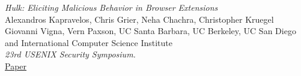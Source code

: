 \documentclass[12pt]{article}
\begin{document}
\begin{multicols}{2}
\begin{thebibliography}{3}
\emph{Hulk: Eliciting Malicious Behavior in Browser Extensions}\\
Alexandros Kapravelos, Chris Grier, Neha Chachra, Christopher Kruegel
Giovanni Vigna, Vern Paxson,
UC Santa Barbara,
UC Berkeley, 
UC San Diego and 
International Computer Science Institute\\
\emph{23rd USENIX Security Symposium.}\\
\href{https://www.usenix.org/system/files/conference/usenixsecurity14/sec14-paper-kapravelos.pdf}{Paper}\\

\end{thebibliography}
\end{multicols}
 
\end{document}
